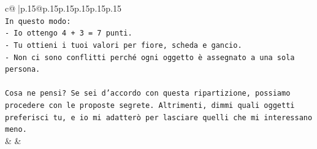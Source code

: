 \documentclass{article}
\begin{document}
{\begin{supertabular}{c@{$\;$}|p{.15\linewidth}@{}p{.15\linewidth}p{.15\linewidth}p{.15\linewidth}p{.15\linewidth}p{.15\linewidth}}
{{{\\ 
\texttt{In questo modo:} \\
\texttt{{-} Io ottengo 4 + 3 = 7 punti.} \\
\texttt{{-} Tu ottieni i tuoi valori per fiore, scheda e gancio.} \\
\texttt{{-} Non ci sono conflitti perché ogni oggetto è assegnato a una sola persona.} \\
\\ 
\texttt{Cosa ne pensi? Se sei d'accordo con questa ripartizione, possiamo procedere con le proposte segrete. Altrimenti, dimmi quali oggetti preferisci tu, e io mi adatterò per lasciare quelli che mi interessano meno.} \\
            }
        }
    }
    & & \\ \\


\end{supertabular}}
\end{document}
